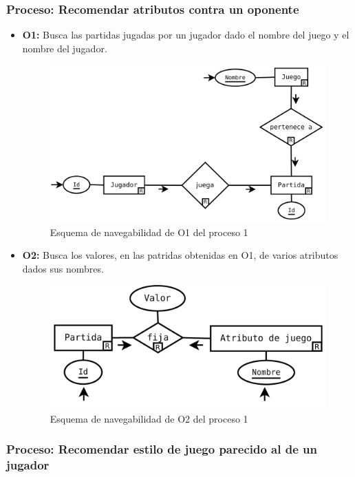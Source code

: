 \subsubsection{Proceso: Recomendar atributos contra un oponente}

\begin{itemize}
	\item \textbf{O1:} Busca las partidas jugadas por un jugador dado el nombre del juego y
		el nombre del jugador.\\

	\begin{figure}[H]
		\centering
		\includegraphics[width=0.5\linewidth]{../Diagramas/pdf/Consejos/Op1-1.pdf}
		\caption{Esquema de navegabilidad de O1 del proceso 1}
	\end{figure}

	\item \textbf{O2:} Busca los valores, en las patridas obtenidas
		en O1, de varios atributos dados sus nombres.\\

	\begin{figure}[H]
		\centering
		\includegraphics[width=0.5\linewidth]{../Diagramas/pdf/Consejos/Op1-2.pdf}
		\caption{Esquema de navegabilidad de O2 del proceso 1}
	\end{figure}
\end{itemize}



\subsubsection{Proceso: Recomendar estilo de juego parecido al de un jugador}

